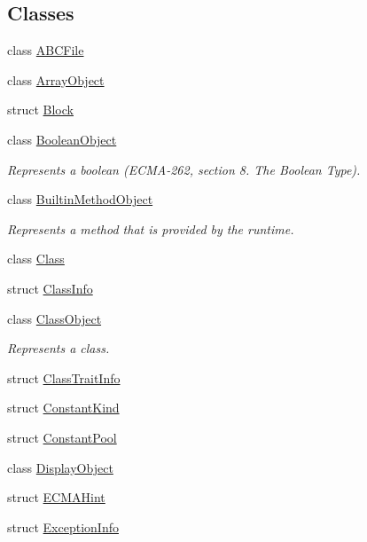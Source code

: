 \subsection*{Classes}
\begin{DoxyCompactItemize}
\item 
class \hyperlink{classjswf_1_1avm2_1_1_a_b_c_file}{A\+B\+C\+File}
\item 
class \hyperlink{classjswf_1_1avm2_1_1_array_object}{Array\+Object}
\item 
struct \hyperlink{structjswf_1_1avm2_1_1_block}{Block}
\item 
class \hyperlink{classjswf_1_1avm2_1_1_boolean_object}{Boolean\+Object}
\begin{DoxyCompactList}\small\item\em Represents a boolean (E\+C\+M\+A-\/262, section 8. {\itshape The Boolean Type}). \end{DoxyCompactList}\item 
class \hyperlink{classjswf_1_1avm2_1_1_builtin_method_object}{Builtin\+Method\+Object}
\begin{DoxyCompactList}\small\item\em Represents a method that is provided by the runtime. \end{DoxyCompactList}\item 
class \hyperlink{classjswf_1_1avm2_1_1_class}{Class}
\item 
struct \hyperlink{structjswf_1_1avm2_1_1_class_info}{Class\+Info}
\item 
class \hyperlink{classjswf_1_1avm2_1_1_class_object}{Class\+Object}
\begin{DoxyCompactList}\small\item\em Represents a class. \end{DoxyCompactList}\item 
struct \hyperlink{structjswf_1_1avm2_1_1_class_trait_info}{Class\+Trait\+Info}
\item 
struct \hyperlink{structjswf_1_1avm2_1_1_constant_kind}{Constant\+Kind}
\item 
struct \hyperlink{structjswf_1_1avm2_1_1_constant_pool}{Constant\+Pool}
\item 
class \hyperlink{classjswf_1_1avm2_1_1_display_object}{Display\+Object}
\item 
struct \hyperlink{structjswf_1_1avm2_1_1_e_c_m_a_hint}{E\+C\+M\+A\+Hint}
\item 
struct \hyperlink{structjswf_1_1avm2_1_1_exception_info}{Exception\+Info}
\item 

\end{DoxyCompactItemize}
